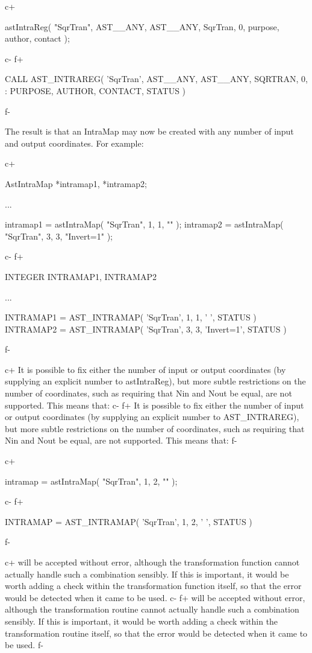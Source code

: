 \documentclass[twoside,11pt]{starlink}
\begin{document}
c+
\small
\begin{terminalv}
astIntraReg( "SqrTran", AST__ANY, AST__ANY, SqrTran, 0,
             purpose, author, contact );
\end{terminalv}
\normalsize
c-
f+
\small
\begin{terminalv}
      CALL AST_INTRAREG( 'SqrTran', AST__ANY, AST__ANY, SQRTRAN, 0,
     :                   PURPOSE, AUTHOR, CONTACT, STATUS )
\end{terminalv}
\normalsize
f-

The result is that an IntraMap may now be created with any number of
input and output coordinates. For example:

c+
\small
\begin{terminalv}
AstIntraMap *intramap1, *intramap2;

...

intramap1 = astIntraMap( "SqrTran", 1, 1, "" );
intramap2 = astIntraMap( "SqrTran", 3, 3, "Invert=1" );
\end{terminalv}
\normalsize
c-
f+
\small
\begin{terminalv}
      INTEGER INTRAMAP1, INTRAMAP2

      ...

      INTRAMAP1 = AST_INTRAMAP( 'SqrTran', 1, 1, ' ', STATUS )
      INTRAMAP2 = AST_INTRAMAP( 'SqrTran', 3, 3, 'Invert=1', STATUS )
\end{terminalv}
\normalsize
f-

c+
It is possible to fix either the number of input or output coordinates
(by supplying an explicit number to astIntraReg), but more subtle
restrictions on the number of coordinates, such as requiring that Nin
and Nout be equal, are not supported. This means that:
c-
f+
It is possible to fix either the number of input or output coordinates
(by supplying an explicit number to AST\_INTRAREG), but more subtle
restrictions on the number of coordinates, such as requiring that Nin
and Nout be equal, are not supported. This means that:
f-

c+
\small
\begin{terminalv}
intramap = astIntraMap( "SqrTran", 1, 2, "" );
\end{terminalv}
\normalsize
c-
f+
\small
\begin{terminalv}
      INTRAMAP = AST_INTRAMAP( 'SqrTran', 1, 2, ' ', STATUS )
\end{terminalv}
\normalsize
f-

c+
will be accepted without error, although the transformation function
cannot actually handle such a combination sensibly. If this is
important, it would be worth adding a check within the transformation
function itself, so that the error would be detected when it came to
be used.
c-
f+
will be accepted without error, although the transformation routine
cannot actually handle such a combination sensibly. If this is
important, it would be worth adding a check within the transformation
routine itself, so that the error would be detected when it came to be
used.
f-
\end{document}
